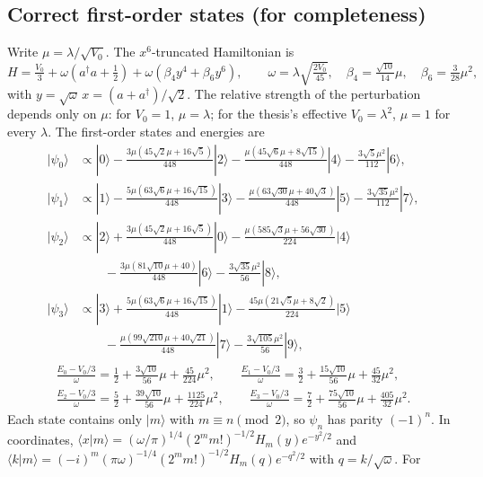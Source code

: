 \documentclass[11pt,a4paper]{article}
\newcommand{\ket}[1]{|#1\rangle}
\begin{document}
\subsection{Correct first-order states (for completeness)}
Write $\mu=\lambda/\sqrt{V_0}$. The $x^6$-truncated Hamiltonian is
\begin{equation}
H=\tfrac{V_0}{3}+\omega\left(a^\dagger a+\tfrac12\right)+\omega\left(\beta_4y^4+\beta_6y^6\right),\qquad
\omega=\lambda\sqrt{\tfrac{2V_0}{45}},\quad \beta_4=\tfrac{\sqrt{10}}{14}\mu,\quad \beta_6=\tfrac{3}{28}\mu^2,
\label{eq:Hwell}
\end{equation}
with $y=\sqrt\omega\,x=(a+a^\dagger)/\sqrt2$. The relative strength of the perturbation depends
only on $\mu$: for $V_0=1$, $\mu=\lambda$; for the thesis's effective $V_0=\lambda^2$, $\mu=1$
for every $\lambda$. The first-order states and energies are
\begin{align*}
\ket{\psi_0}&\propto\ket0-\frac{3\mu(45\sqrt2\mu+16\sqrt5)}{448}\ket2-\frac{\mu(45\sqrt6\mu+8\sqrt{15})}{448}\ket4-\frac{3\sqrt5\mu^2}{112}\ket6,\\
\ket{\psi_1}&\propto\ket1-\frac{5\mu(63\sqrt6\mu+16\sqrt{15})}{448}\ket3-\frac{\mu(63\sqrt{30}\mu+40\sqrt3)}{448}\ket5-\frac{3\sqrt{35}\mu^2}{112}\ket7,\\
\ket{\psi_2}&\propto\ket2+\frac{3\mu(45\sqrt2\mu+16\sqrt5)}{448}\ket0-\frac{\mu(585\sqrt3\mu+56\sqrt{30})}{224}\ket4\\
&\qquad-\frac{3\mu(81\sqrt{10}\mu+40)}{448}\ket6-\frac{3\sqrt{35}\mu^2}{56}\ket8,\\
\ket{\psi_3}&\propto\ket3+\frac{5\mu(63\sqrt6\mu+16\sqrt{15})}{448}\ket1-\frac{45\mu(21\sqrt5\mu+8\sqrt2)}{224}\ket5\\
&\qquad-\frac{\mu(99\sqrt{210}\mu+40\sqrt{21})}{448}\ket7-\frac{3\sqrt{105}\mu^2}{56}\ket9,
\end{align*}
\begin{gather*}
\frac{E_0-V_0/3}{\omega}=\frac12+\frac{3\sqrt{10}}{56}\mu+\frac{45}{224}\mu^2,\qquad
\frac{E_1-V_0/3}{\omega}=\frac32+\frac{15\sqrt{10}}{56}\mu+\frac{45}{32}\mu^2,\\
\frac{E_2-V_0/3}{\omega}=\frac52+\frac{39\sqrt{10}}{56}\mu+\frac{1125}{224}\mu^2,\qquad
\frac{E_3-V_0/3}{\omega}=\frac72+\frac{75\sqrt{10}}{56}\mu+\frac{405}{32}\mu^2.
\end{gather*}
Each state contains only $\ket m$ with $m\equiv n\pmod2$, so $\psi_n$ has parity $(-1)^n$. In
coordinates, $\langle x|m\rangle=(\omega/\pi)^{1/4}(2^mm!)^{-1/2}H_m(y)e^{-y^2/2}$ and
$\langle k|m\rangle=(-i)^m(\pi\omega)^{-1/4}(2^mm!)^{-1/2}H_m(q)e^{-q^2/2}$ with $q=k/\sqrt\omega$. For
\end{document}

